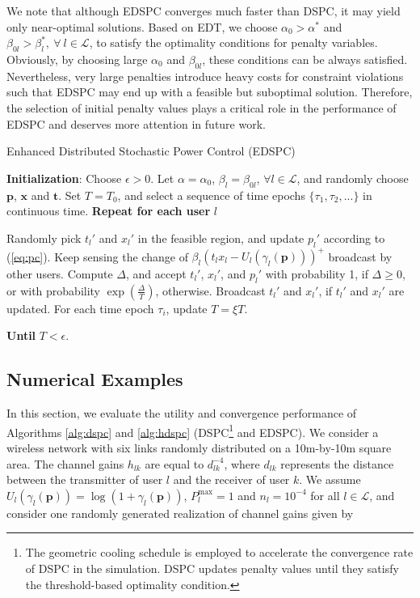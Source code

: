 \documentclass[10pt,journal,letterpaper,compsoc]{IEEEtran}
\begin{document}
{{We note that although EDSPC converges much faster than DSPC, it may yield only near-optimal solutions. Based on EDT, we  choose $\alpha_0>\alpha^*$ and $\beta_{0l}>\beta_l^*,~\forall~l\in\mathcal{L}$, to satisfy the optimality conditions for penalty variables. Obviously, by choosing large $\alpha_0$ and $\beta_{0l}$, these conditions can be always satisfied. Nevertheless, very large penalties introduce heavy costs for constraint violations such that EDSPC may end up with a feasible but suboptimal solution. Therefore, the selection of initial penalty values plays a critical role in  the performance of EDSPC and deserves more attention in future work.



\begin{algorithm}
\caption{Enhanced Distributed Stochastic Power Control (EDSPC)}
\label{alg:hdspc}
\begin{algorithmic}
\STATE \textbf{Initialization}: Choose $\epsilon>0$. Let $\alpha=\alpha_0$, $\beta_l=\beta_{0l}$, $\forall l\in\mathcal{L}$, and randomly choose $\mathbf{p}$, $\mathbf{x}$ and $\mathbf{t}$.
\STATE Set $T=T_0$, and select a sequence of time epochs $\{\tau_1,\tau_2,... \}$ in continuous time.
\STATE \textbf{Repeat for each user} $l$
\begin{enumerate}
\STATE Randomly pick $t_l'$ and $x_l'$ in the feasible region, and update $p_l'$ according to (\ref{eq:pc}).
\STATE Keep sensing the change of $\beta_l(t_lx_l- U_l(\gamma_l(\mathbf{p})))^{+}$ broadcast by other users.
\STATE Compute $\Delta$, and accept $t_l'$, $x_l'$, and $p_l'$ with probability 1, if $\Delta\ge 0$, or with probability $\exp(\frac{\Delta}{T})$, otherwise.
\STATE Broadcast $t_l'$ and $x_l'$, if $t_l'$ and $x_l'$ are updated.
\STATE For each time epoch $\tau_i$, update $T=\xi T$.
\end{enumerate}
\STATE \textbf{Until} $T<\epsilon$.
\end{algorithmic}
\end{algorithm}

\subsection{Numerical Examples}\label{sec:unicastnumerical}

In this section, we evaluate the utility and convergence performance of Algorithms \ref{alg:dspc} and \ref{alg:hdspc} (DSPC\footnote{The geometric cooling schedule is employed to accelerate the convergence rate of DSPC in the simulation. DSPC updates penalty values until they satisfy the threshold-based optimality condition.} and EDSPC). We consider a wireless network with six links randomly distributed on a 10m-by-10m square area. The channel gains $h_{lk}$ are equal to $d_{lk}^{-4}$, where $d_{lk}$ represents the distance between the transmitter of user $l$ and the receiver of user $k$. We assume  $U_l(\gamma_l(\mathbf{p}))=\log(1+\gamma_l(\mathbf{p}))$, $P_{l}^{\max}=1$ and $n_l=10^{-4}$ for all $l\in\mathcal{L}$, and consider one randomly generated realization of channel gains given by

}}
\end{document}
